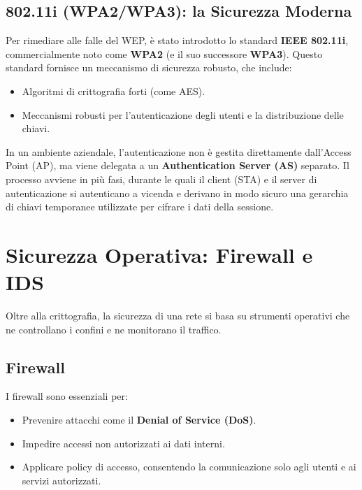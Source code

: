 \subsection{802.11i (WPA2/WPA3): la Sicurezza Moderna}
Per rimediare alle falle del WEP, è stato introdotto lo standard \textbf{IEEE 802.11i}, commercialmente noto come \textbf{WPA2} (e il suo successore \textbf{WPA3}). Questo standard fornisce un meccanismo di sicurezza robusto, che include:
\begin{itemize}
    \item Algoritmi di crittografia forti (come AES).
    \item Meccanismi robusti per l'autenticazione degli utenti e la distribuzione delle chiavi.
\end{itemize}

In un ambiente aziendale, l'autenticazione non è gestita direttamente dall'Access Point (AP), ma viene delegata a un \textbf{Authentication Server (AS)} separato. Il processo avviene in più fasi, durante le quali il client (STA) e il server di autenticazione si autenticano a vicenda e derivano in modo sicuro una gerarchia di chiavi temporanee utilizzate per cifrare i dati della sessione.

\section{Sicurezza Operativa: Firewall e IDS}
Oltre alla crittografia, la sicurezza di una rete si basa su strumenti operativi che ne controllano i confini e ne monitorano il traffico.

\subsection{Firewall}



I firewall sono essenziali per:
\begin{itemize}
    \item Prevenire attacchi come il \textbf{Denial of Service (DoS)}.
    \item Impedire accessi non autorizzati ai dati interni.
    \item Applicare policy di accesso, consentendo la comunicazione solo agli utenti e ai servizi autorizzati.
\end{itemize}

